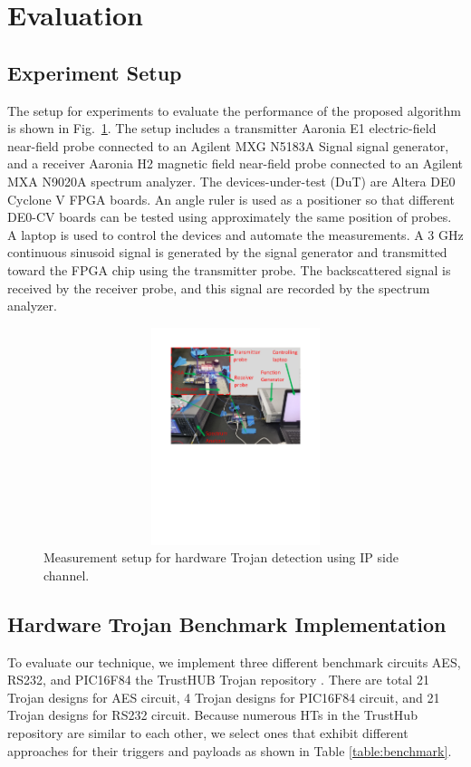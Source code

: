 \documentclass[journal]{IEEEtran}
\begin{document}
\section{Evaluation} \label{evaluation}
\subsection{Experiment Setup}
The setup for experiments to evaluate the performance of the proposed algorithm is shown in Fig.~\ref{fig:meassetup}. The setup includes a transmitter Aaronia E1 electric-field near-field probe connected to an Agilent MXG N5183A Signal signal generator, and a receiver Aaronia H2 magnetic field near-field probe connected to an Agilent MXA N9020A spectrum analyzer. The devices-under-test (DuT) are Altera DE0 Cyclone V FPGA boards. An angle ruler is used as a positioner so that different DE0-CV boards can be tested using approximately the same position of probes. A laptop is used to control the devices and automate the measurements. A 3 GHz continuous sinusoid signal is generated by the signal generator and transmitted toward the FPGA chip using the transmitter probe. The backscattered signal is received by the receiver probe, and this signal are recorded by the spectrum analyzer.
\begin{figure}[htb]	
	\centering
	\includegraphics[viewport=1in 5in 16in 10in, clip,height=2.5in,width=8.1in,scale=1]{fig/measurement_setup_2.pdf}
	\caption{Measurement setup for hardware Trojan detection using IP side channel.}
	\label{fig:meassetup}	
\end{figure}
\subsection{Hardware Trojan Benchmark Implementation}
To evaluate our technique, we implement three
different benchmark circuits AES, RS232, and PIC16F84 the TrustHUB
Trojan repository \cite{Trusthub}. There are total 21 Trojan designs for AES circuit, 4 Trojan designs for PIC16F84 circuit, and 21 Trojan designs for RS232 circuit. Because numerous HTs in the TrustHub repository are similar to each other, we select ones that exhibit different approaches for their triggers and payloads as shown in Table \ref{table:benchmark}.
\end{document}
